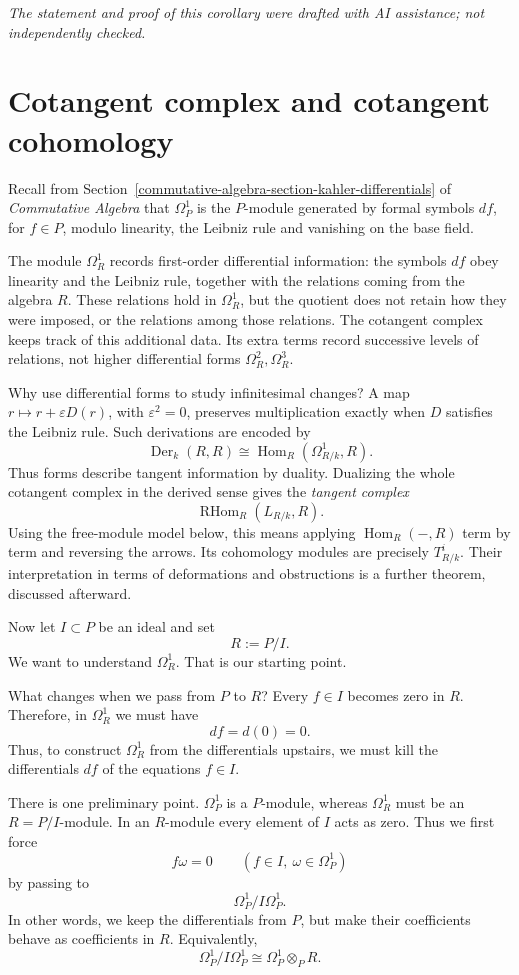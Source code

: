 \noindent
\emph{The statement and proof of this
corollary were drafted with AI assistance;
not independently checked.}

\section{Cotangent complex and
cotangent cohomology}
\label{section-cotangent-complex-primer}

\noindent
Recall from
Section~\ref{commutative-algebra-section-kahler-differentials}
of \emph{Commutative Algebra} that
$\Omega^1_P$ is the $P$-module generated by
formal symbols $df$, for $f\in P$, modulo
linearity, the Leibniz rule and vanishing
on the base field.

The module $\Omega^1_R$ records
first-order differential information:
the symbols $df$ obey linearity and the
Leibniz rule, together with the relations
coming from the algebra $R$.
These relations hold in $\Omega^1_R$,
but the quotient does not retain how
they were imposed, or the relations
among those relations.
The cotangent complex keeps track of
this additional data.
Its extra terms record successive levels
of relations, not higher differential
forms $\Omega^2_R,\Omega^3_R$.


Why use differential forms to study
infinitesimal changes? A map
$r\mapsto r+\varepsilon D(r)$, with
$\varepsilon^2=0$, preserves multiplication
exactly when $D$ satisfies the Leibniz
rule. Such derivations are encoded by
$$
\operatorname{Der}_k(R,R)
\cong\operatorname{Hom}_R(\Omega^1_{R/k},R).
$$
Thus forms describe tangent information
by duality. Dualizing the whole cotangent
complex in the derived sense gives the
\emph{tangent complex}
$$
\operatorname{RHom}_R(L_{R/k},R).
$$
Using the free-module model below, this
means applying $\operatorname{Hom}_R(-,R)$
term by term and reversing the arrows.
Its cohomology modules are precisely
$T^i_{R/k}$. Their interpretation in terms
of deformations and obstructions is a
further theorem, discussed afterward.

Now let $I\subset P$ be an ideal and set
$$
R:=P/I.
$$
We want to understand $\Omega^1_R$. That is our starting point.

What changes when we pass from $P$ to $R$? Every $f\in I$ becomes zero in $R$. Therefore, in $\Omega^1_R$ we must have
$$
df=d(0)=0.
$$
Thus, to construct $\Omega^1_R$ from the differentials upstairs, we must kill the differentials $df$ of the equations $f\in I$.

There is one preliminary point. $\Omega^1_P$ is a $P$-module, whereas $\Omega^1_R$ must be an $R=P/I$-module. In an $R$-module every element of $I$ acts as zero. Thus we first force
$$
f\omega=0\qquad(f\in I,\ \omega\in\Omega^1_P)
$$
by passing to
$$
\Omega^1_P/I\Omega^1_P.
$$
In other words, we keep the differentials from $P$, but make their coefficients behave as coefficients in $R$. Equivalently,
$$
\Omega^1_P/I\Omega^1_P\cong\Omega^1_P\otimes_P R.
$$

